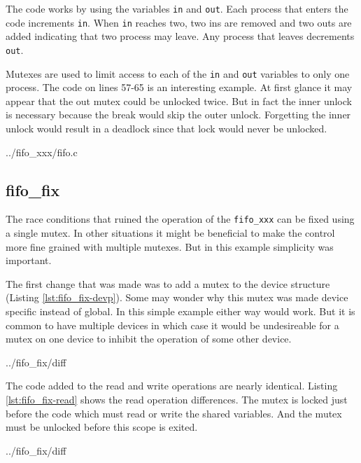 \documentclass{article}
\begin{document}
The code works by using the variables \verb+in+ and \verb+out+.
Each process that enters the code increments \verb+in+.
When \verb+in+ reaches two, two ins are removed and two outs are added
indicating that two process may leave.
Any process that leaves decrements \verb+out+.

Mutexes are used to limit access to each of the \verb+in+ and
\verb+out+ variables to only one process.
The code on lines 57-65 is an interesting example.
At first glance it may appear that the out mutex could be unlocked
twice.
But in fact the inner unlock is necessary because the break would
skip the outer unlock.
Forgetting the inner unlock would result in a deadlock since that lock
would never be unlocked.


	{../fifo_xxx/fifo.c}


\clearpage
\subsection{fifo\_fix}

The race conditions that ruined the operation of the \verb+fifo_xxx+
can be fixed using a single mutex.
In other situations it might be beneficial to make the control more
fine grained with multiple mutexes.
But in this example simplicity was important.

The first change that was made was to add a mutex to the
device structure (Listing \ref{lst:fifo_fix-devp}).
Some may wonder why this mutex was made device specific instead of global.
In this simple example either way would work.
But it is common to have multiple devices in which case it would be
undesireable for a mutex on one device to inhibit the operation of
some other device.


	{../fifo_fix/diff}

The code added to the read and write operations are nearly identical.
Listing \ref{lst:fifo_fix-read} shows the read operation differences.
The mutex is locked just before the code which must read or write the
shared variables.
And the mutex must be unlocked before this scope is exited.


	{../fifo_fix/diff}
\end{document}
